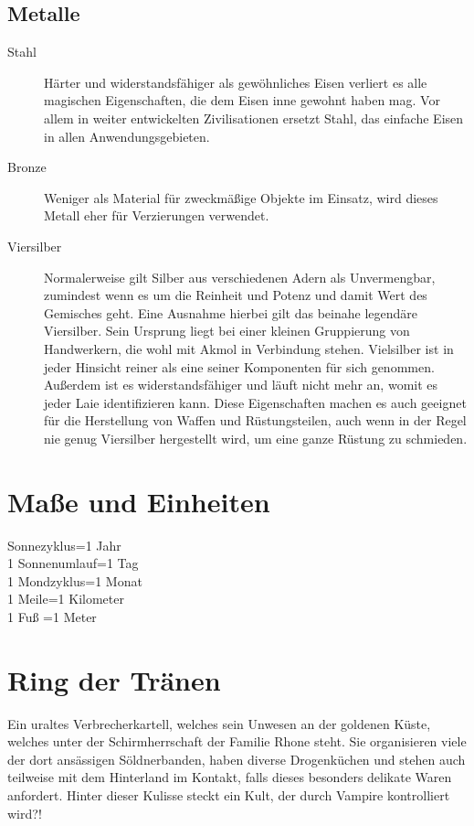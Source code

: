 \documentclass[a4paper,12pt,oneside]{book}
\begin{document}
\section{Metalle}
\begin{description}
\item[Stahl]Härter und widerstandsfähiger als gewöhnliches Eisen verliert es alle magischen Eigenschaften, die dem Eisen inne gewohnt haben mag. Vor allem in weiter entwickelten Zivilisationen ersetzt Stahl, das einfache Eisen in allen Anwendungsgebieten.
\item[Bronze]Weniger als Material für zweckmäßige Objekte im Einsatz, wird dieses Metall eher für Verzierungen verwendet.
\item[Viersilber]Normalerweise gilt Silber aus verschiedenen Adern als Unvermengbar, zumindest wenn es um die Reinheit und Potenz und damit Wert des Gemisches geht. Eine Ausnahme hierbei gilt das beinahe legendäre Viersilber. Sein Ursprung liegt bei einer kleinen Gruppierung von Handwerkern, die wohl mit Akmol in Verbindung stehen. Vielsilber ist in jeder Hinsicht reiner als eine seiner Komponenten für sich genommen. Außerdem ist es widerstandsfähiger und läuft nicht mehr an, womit es jeder Laie identifizieren kann. Diese Eigenschaften machen es auch geeignet für die Herstellung von Waffen und Rüstungsteilen, auch wenn in der Regel nie genug Viersilber hergestellt wird, um eine ganze Rüstung zu schmieden.
\end{description}


\chapter{Maße und Einheiten}
Sonnezyklus=1 Jahr
\\1 Sonnenumlauf=1 Tag
\\1 Mondzyklus=1 Monat
\\1 Meile=1 Kilometer
\\1 Fuß =1 Meter

\chapter{Ring der Tränen}
Ein uraltes Verbrecherkartell, welches sein Unwesen an der goldenen Küste, welches unter der Schirmherrschaft der Familie Rhone steht. Sie organisieren viele der dort ansässigen Söldnerbanden, haben diverse Drogenküchen und stehen auch teilweise mit dem Hinterland im Kontakt, falls dieses besonders delikate Waren anfordert. Hinter dieser Kulisse steckt ein Kult, der durch Vampire kontrolliert wird?!
\end{document}

